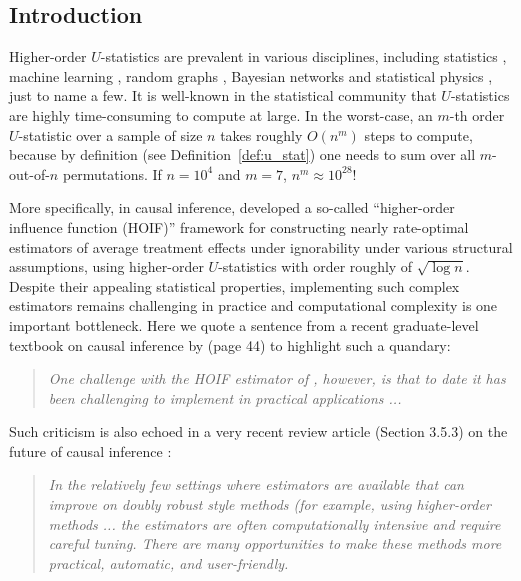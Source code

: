 \documentclass[letterpaper,11pt]{article}
\begin{document}
\begin{bibunit}[plainnat]

\section{Introduction}
\label{sec:intro}
Higher-order $U$-statistics are prevalent in various disciplines, including statistics \citep{robins2008higher, bonvini2022fast, bonvini2024doubly, neykov2021minimax, yao2018testing, breunig2024adaptive, sturma2024testing, shao2025u}, machine learning \citep{clemenccon2008ranking, clemenccon2013maximal, shen2025engression}, random graphs \citep{chatterjee2024higher}, Bayesian networks and statistical physics \citep{pearl1988probabilistic, shpitser2011efficient, li2020random}, just to name a few. It is well-known in the statistical community that $U$-statistics are highly time-consuming to compute at large. In the worst-case, an $m$-th order $U$-statistic over a sample of size $n$ takes roughly $O (n^{m})$ steps to compute, because by definition (see Definition~\ref{def:u_stat}) one needs to sum over all $m$-out-of-$n$ permutations. If $n = 10^{4}$ and $m = 7$, $n^{m} \approx 10^{28}$! 

More specifically, in causal inference, \citet{robins2008higher, robins2017minimax} developed a so-called ``higher-order influence function (HOIF)'' framework for constructing nearly rate-optimal estimators of average treatment effects under ignorability under various structural assumptions, using higher-order $U$-statistics with order roughly of $\sqrt{\log n}$. Despite their appealing statistical properties, implementing such complex estimators remains challenging in practice and computational complexity is one important bottleneck. Here we quote a sentence from a recent graduate-level textbook on causal inference by \citet{wager2024causal} (page 44) to highlight such a quandary:
\begin{quote}
\emph{One challenge with the HOIF estimator of \citet{robins2017minimax}, however, is that to date it has been challenging to implement in practical applications ...}
\end{quote}
Such criticism is also echoed in a very recent review article (Section 3.5.3) on the future of causal inference \citep{cinelli2025challenges}:
\begin{quote}
\emph{In the relatively few settings where estimators are available that can improve on doubly robust style methods (for example, using higher-order methods ... the estimators are often computationally intensive and require careful tuning. There are many opportunities to make these methods more practical, automatic, and user-friendly.}
\end{quote}


\end{bibunit}
\end{document}
